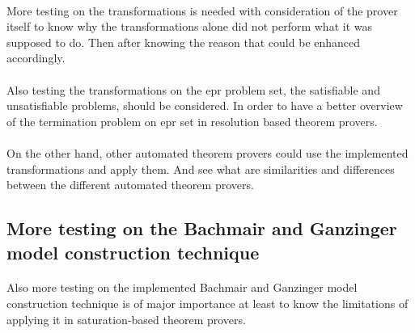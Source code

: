 			\paragraph{ }
			More testing on the transformations is needed with consideration of the prover itself to know why the transformations alone did not perform what it was supposed to do. Then after knowing the reason that could be enhanced accordingly.			
			
			\paragraph{}
			Also testing the transformations on the \ac{epr} problem set, the satisfiable and unsatisfiable problems, should be considered. In order to have a better overview of the termination problem on \ac{epr} set in resolution based theorem provers. 			
			
			\paragraph{}
			On the other hand, other automated theorem provers could use the implemented transformations and apply them. And see what are similarities and differences between the different automated theorem provers.
		
		\subsection{More testing on the Bachmair and Ganzinger model construction technique}\label{sub:c7s2s3}
			\paragraph{ }
			Also more testing on the implemented Bachmair and Ganzinger model construction technique is of major importance at least to know the limitations of applying it in saturation-based theorem provers. 		
		
		
		
		
		
		
		
		
		
		
		
		
		
		
		
		
		

